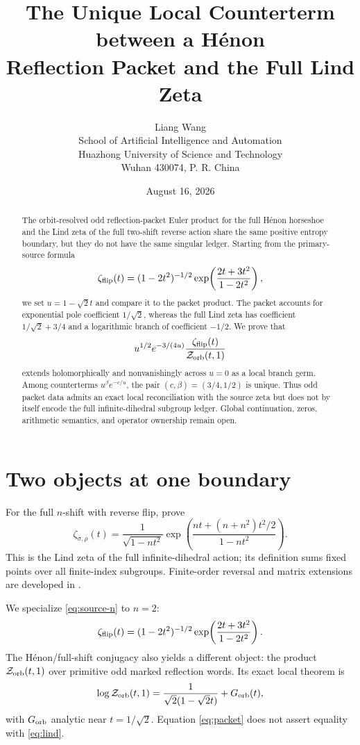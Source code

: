 \documentclass[11pt]{article}
\title{The Unique Local Counterterm between a H\'enon\\Reflection Packet and the Full Lind Zeta}
\author{Liang Wang\\\small School of Artificial Intelligence and Automation\\\small Huazhong University of Science and Technology\\\small Wuhan 430074, P. R. China}
\date{August 16, 2026}
\newcommand{\Zorb}{\mathcal Z_{\rm orb}}
\newcommand{\zflip}{\zeta_{\rm flip}}
\begin{document}
\maketitle

\begin{abstract}
The orbit-resolved odd reflection-packet Euler product for the full H\'enon
horseshoe and the Lind zeta of the full two-shift reverse action share the
same positive entropy boundary, but they do not have the same singular
ledger.  Starting from the primary-source formula
\[
 \zeta_{\rm flip}(t)=(1-2t^2)^{-1/2}
 \exp\!\left(\frac{2t+3t^2}{1-2t^2}\right),
\]
we set $u=1-\sqrt2t$ and compare it to the packet product.  The packet
accounts for exponential pole coefficient $1/\sqrt2$, whereas the full Lind
zeta has coefficient $1/\sqrt2+3/4$ and a logarithmic branch of coefficient
$-1/2$.  We prove that
\[
 u^{1/2}e^{-3/(4u)}
 \frac{\zeta_{\rm flip}(t)}{\mathcal Z_{\rm orb}(t,1)}
\]
extends holomorphically and nonvanishingly across $u=0$ as a local branch
germ.  Among counterterms $u^\beta e^{-c/u}$, the pair
$(c,\beta)=(3/4,1/2)$ is unique.  Thus odd packet data admits an exact local
reconciliation with the source zeta but does not by itself encode the full
infinite-dihedral subgroup ledger.  Global continuation, zeros, arithmetic
semantics, and operator ownership remain open.
\end{abstract}

\section{Two objects at one boundary}

For the full $n$-shift with reverse flip, \citet[Example~4.3]{KimLeePark2003}
prove
\begin{equation}\label{eq:source-n}
 \zeta_{\sigma,\rho}(t)=
 \frac1{\sqrt{1-nt^2}}
 \exp\!\left(
 \frac{nt+(n+n^2)t^2/2}{1-nt^2}
 \right).
\end{equation}
This is the Lind zeta of the full infinite-dihedral action; its definition
sums fixed points over all finite-index subgroups.  Finite-order reversal and
matrix extensions are developed in \citet{Ryu2019}.

We specialize \eqref{eq:source-n} to $n=2$:
\begin{equation}\label{eq:lind}
 \zflip(t)=(1-2t^2)^{-1/2}
 \exp\!\left(\frac{2t+3t^2}{1-2t^2}\right).
\end{equation}
The H\'enon/full-shift conjugacy \cite{DevaneyNitecki1979} also yields a
different object: the product $\Zorb(t,1)$ over primitive odd marked
reflection words.  Its exact local theorem is
\begin{equation}\label{eq:packet}
 \log\Zorb(t,1)=
 \frac{1}{\sqrt2(1-\sqrt2t)}+G_{\rm orb}(t),
\end{equation}
with $G_{\rm orb}$ analytic near $t=1/\sqrt2$.  Equation
\eqref{eq:packet} does not assert equality with \eqref{eq:lind}.
\end{document}
